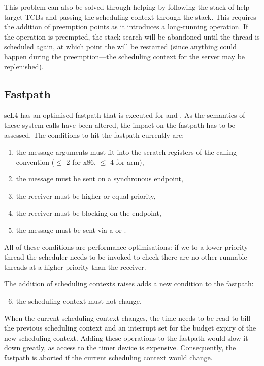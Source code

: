 This problem can also be solved through helping by following the stack of help-target TCBs and passing the scheduling context through the stack.
This requires the addition of preemption points as it introduces a long-running operation.
If the operation is preempted, the stack search will be abandoned until the thread is scheduled again, at which point the \call will be restarted (since anything could happen during the preemption---the scheduling context for the server may be replenished).

\subsection{Fastpath}

seL4 has an optimised fastpath that is executed for \call and \replyrecv.
As the semantics of these system calls have been altered, the impact on the fastpath has to be assessed.
The conditions to hit the fastpath currently are:
\begin{enumerate}
    \item the message arguments must fit into the scratch registers of the calling convention ($\leq$ 2 for x86, $\leq$ 4 for arm),
    \item the message must be sent on a synchronous endpoint,
    \item the receiver must be higher or equal priority,
    \item the receiver must be blocking on the endpoint,
    \item the message must be sent via a \call or \replyrecv.
\end{enumerate}
All of these conditions are performance optimisations: if we \call to a lower priority thread the
scheduler needs to be invoked to check there are no other runnable threads at a higher priority than the receiver.

The addition of scheduling contexts raises adds a new condition to the fastpath:
\begin{enumerate}
    \setcounter{enumi}{5}
    \item the scheduling context must not change.
\end{enumerate}
When the current scheduling context changes, the time needs to be read to bill the previous scheduling context and an interrupt set for the budget expiry of the new scheduling context.
Adding these operations to the fastpath would slow it down greatly, as access to the timer device is expensive.
Consequently, the fastpath is aborted if the current scheduling context would change.

